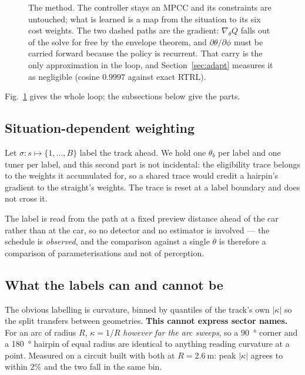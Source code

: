 \documentclass[letterpaper, 10 pt, conference]{ieeeconf}
\begin{document}
\begin{figure}[t]
  \caption{The method. The controller stays an MPCC and its constraints are
  untouched; what is learned is a map from the situation to its six cost
  weights. The two dashed paths are the gradient: $\nabla_\theta Q$ falls out of
  the solve for free by the envelope theorem, and $\partial\theta/\partial\phi$
  must be carried forward because the policy is recurrent. That carry is the
  only approximation in the loop, and Section~\ref{sec:adapt} measures it as
  negligible (cosine $0.9997$ against exact RTRL).}
  \label{fig:arch}
\end{figure}

Fig.~\ref{fig:arch} gives the whole loop; the subsections below give the parts.

\subsection{Situation-dependent weighting}
Let $\sigma : s \mapsto \{1,\dots,B\}$ label the track ahead. We hold one
$\theta_b$ per label and one tuner per label, and this second part is not
incidental: the eligibility trace belongs to the weights it accumulated for, so
a shared trace would credit a hairpin's gradient to the straight's weights. The
trace is reset at a label boundary and does not cross it.

The label is read from the path at a fixed preview distance ahead of the car
rather than at the car, so no detector and no estimator is involved --- the
schedule is \emph{observed}, and the comparison against a single $\theta$ is
therefore a comparison of parameterisations and not of perception.

\subsection{What the labels can and cannot be}\label{sec:sectors}
The obvious labelling is curvature, binned by quantiles of the track's own
$|\kappa|$ so the split transfers between geometries. \textbf{This cannot
express sector names.} For an arc of radius $R$, $\kappa = 1/R$ \emph{however
far the arc sweeps}, so a \SI{90}{\degree} corner and a \SI{180}{\degree}
hairpin of equal radius are identical to anything reading curvature at a point.
Measured on a circuit built with both at $R = \SI{2.6}{\meter}$: peak $|\kappa|$
agrees to within $2\%$ and the two fall in the same bin.
\end{document}
